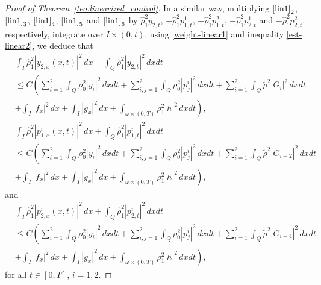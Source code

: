 \documentclass[11pt,a4paper]{amsart}
\numberwithin{equation}{section}
\begin{document}
\begin{proof}[Proof of Theorem~\ref{teo:linearized_control}]
\noindent In a similar way, multiplying $\eqref{lin1}_{2}$, $\eqref{lin1}_{3}$, $\eqref{lin1}_{4}$, $\eqref{lin1}_{5}$ and $\eqref{lin1}_{6}$      by $\hat{\rho}^{2}_{1}y_{2,t}$, $-\hat{\rho}^{2}_{1}p^{1}_{1,t}$, $-\hat{\rho}^{2}_{1}p^{2}_{1,t}$, $-\hat{\rho}^{2}_{1}p^{1}_{2,t}$ and $-\hat{\rho}^{2}_{1}p^{2}_{2,t}$, respectively,  integrate over  $I\times (0, t)$, using \eqref{weight-linear1} and inequality \eqref{est-linear2}, we deduce that
\begin{equation}\label{linear-eq9}
\begin{split}
&\int_{I}\hat{\rho}^{2}_{1}|y_{2,x}(x,t)|^{2}\,dx+\int_{Q}\hat{\rho}^{2}_{1}|y_{2,t}|^{2}\,dxdt\\
&\leq C\left( \sum_{i=1}^{2}\int_{Q}\rho^{2}_{0}|y_{i}|^{2}\,dxdt+\sum_{i,j=1}^{2}\int_{Q}\rho^{2}_{0}|p^{i}_{j}|^{2}\,dxdt+\sum_{i=1}^{2}\int_{Q}\tilde{\rho}^{2}|G_{i}|^{2}\,dxdt   \right.\\
&\left.+\int_{I}|f_{x}|^{2}\,dx+\int_{I}|g_{x}|^{2}\,dx+\int_{\omega\times (0,T)}\rho^{2}_{1}|h|^{2}\,dxdt\right),
	\end{split}
\end{equation}
\begin{equation}\label{linear-eq10}
\begin{split}
& \int_{I}\hat{\rho}^{2}_{1}|p^{i}_{1,x}(x,t)|^{2}\,dx+\int_{Q}\hat{\rho}^{2}_{1}|p^{i}_{1,t}|^{2}\,dxdt \\
& \leq C\left( \sum_{i=1}^{2}\int_{Q}\rho^{2}_{0}|y_{i}|^{2}\,dxdt+\sum_{i,j=1}^{2}\int_{Q}\rho^{2}_{0}|p^{i}_{j}|^{2}\,dxdt+\sum_{i=1}^{2}\int_{Q}\tilde{\rho}^ {2}|G_{i+2}|^{2}\,dxdt   \right.\\
&\left.+\int_{I}|f_{x}|^{2}\,dx+\int_{I}|g_{x}|^{2}\,dx+\int_{\omega\times (0,T)}\rho^{2}_{1}|h|^{2}\,dxdt\right),
\end{split}
\end{equation}and
\begin{equation}\label{linear-eq11}
\begin{split}
&\int_{I}\hat{\rho}^{2}_{1}|p^{i}_{2,x}(x,t)|^{2}\,dx+\int_{Q}\hat{\rho}^{2}_{1}|p^{i}_{2,t}|^{2}\,dxdt\\
&\leq C\left( \sum_{i=1}^{2}\int_{Q}\rho^{2}_{0}|y_{i}|^{2}\,dxdt+\sum_{i,j=1}^{2}\int_{Q}\rho^{2}_{0}|p^{i}_{j}|^{2}\,dxdt+\sum_{i=1}^{2}\int_{Q}\tilde{\rho}^{2}|G_{i+4}|^{2}\,dxdt   \right.\\
& \left.+\int_{I}|f_{x}|^{2}\,dx+\int_{I}|g_{x}|^{2}\,dx+\int_{\omega\times (0,T)}\rho^{2}_{1}|h|^{2}\,dxdt\right),
\end{split}
\end{equation}for all $t \in [0, T]$, $i=1, 2$.


\end{proof}
\end{document}
